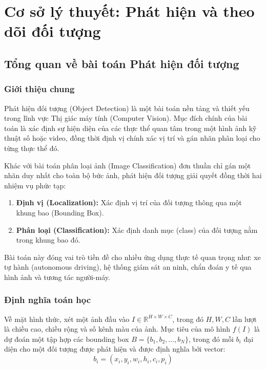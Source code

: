 ﻿\chapter{Cơ sở lý thuyết: Phát hiện và theo dõi đối tượng}
\label{ch:ly_thuyet_detection}

\section{Tổng quan về bài toán Phát hiện đối tượng}

\subsection{Giới thiệu chung}
Phát hiện đối tượng (Object Detection) là một bài toán nền tảng và thiết yếu trong lĩnh vực Thị giác máy tính (Computer Vision). Mục đích chính của bài toán là xác định sự hiện diện của các thực thể quan tâm trong một hình ảnh kỹ thuật số hoặc video, đồng thời định vị chính xác vị trí và gán nhãn phân loại cho từng thực thể đó.

Khác với bài toán phân loại ảnh (Image Classification) đơn thuần chỉ gán một nhãn duy nhất cho toàn bộ bức ảnh, phát hiện đối tượng giải quyết đồng thời hai nhiệm vụ phức tạp:
\begin{enumerate}
    \item \textbf{Định vị (Localization):} Xác định vị trí của đối tượng thông qua một khung bao (Bounding Box).
    \item \textbf{Phân loại (Classification):} Xác định danh mục (class) của đối tượng nằm trong khung bao đó.
\end{enumerate}

Bài toán này đóng vai trò tiền đề cho nhiều ứng dụng thực tế quan trọng như: xe tự hành (autonomous driving), hệ thống giám sát an ninh, chẩn đoán y tế qua hình ảnh và tương tác người-máy.

\subsection{Định nghĩa toán học}
Về mặt hình thức, xét một ảnh đầu vào $I \in \mathbb{R}^{H \times W \times C}$, trong đó $H, W, C$ lần lượt là chiều cao, chiều rộng và số kênh màu của ảnh. Mục tiêu của mô hình $f(I)$ là dự đoán một tập hợp các bounding box $B = \{b_1, b_2, \dots, b_N\}$, trong đó mỗi $b_i$ đại diện cho một đối tượng được phát hiện và được định nghĩa bởi vector:
\begin{equation}
    b_i = (x_i, y_i, w_i, h_i, c_i, p_i)
\end{equation}

